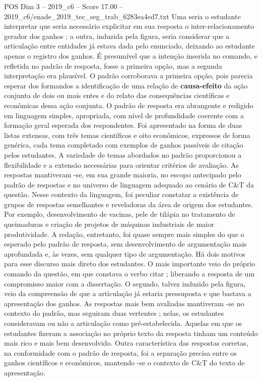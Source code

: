 \begin{textsample}{POS Dim 3 – 2019\_c6 – Score 17.00 – 2019\_c6/enade\_2019\_tec\_seg\_trab\_6283ea4ed7.txt}
Uma seria o estudante interpretar que seria necessário explicitar em sua resposta o inter-relacionamento gerador dos ganhos ; a outra, induzida pela figura, seria considerar que a articulação entre entidades já estava dada pelo enunciado, deixando ao estudante apenas o registro dos ganhos.
É presumível que a intenção inserida no comando, e refletida no padrão de resposta, fosse a primeira opção, mas a segunda interpretação era plausível.
O padrão corroborava a primeira opção, pois parecia esperar dos formandos a identificação de uma relação de \textbf{causa-efeito} da ação conjunta de dois ou mais entes e do relato das consequências científicas e econômicas dessa ação conjunta.
O padrão de resposta era abrangente e redigido em linguagem simples, apropriada, com nível de profundidade coerente com a formação geral esperada dos respondentes.
Foi apresentado na forma de duas listas extensas, com três temas científicos e oito econômicos, expressos de forma genérica, cada tema completado com exemplos de ganhos passíveis de citação pelos estudantes.
A variedade de temas abordados no padrão proporcionou a flexibilidade e a extensão necessárias para orientar critérios de avaliação.
As respostas mantiveram -se, em sua grande maioria, no escopo antecipado pelo padrão de respostas e no universo de linguagem adequado ao cenário de C\&T da questão.
Nesse contexto da linguagem, foi peculiar constatar a existência de grupos de respostas semelhantes e reveladoras da área de origem dos estudantes.
Por exemplo, desenvolvimento de vacinas, pele de tilápia no tratamento de queimaduras e criação de projetos de máquinas industriais de maior produtividade.
A redação, entretanto, foi quase sempre mais simples do que o esperado pelo padrão de resposta, sem desenvolvimento de argumentação mais aprofundada e, às vezes, sem qualquer tipo de argumentação.
Há dois motivos para esse discurso mais direto dos estudantes.
O mais importante veio do próprio comando da questão, em que constava o verbo citar ; liberando a resposta de um compromisso maior com a dissertação.
O segundo, talvez induzido pela figura, veio da compreensão de que a articulação já estaria pressuposta e que bastava a apresentação dos ganhos.
As respostas mais bem avaliadas mantiveram -se no contexto do padrão, mas seguiram duas vertentes ; nelas, os estudantes consideravam ou não a articulação como pré-estabelecida.
Aquelas em que os estudantes fizeram a associação no próprio texto da resposta tinham um conteúdo mais rico e mais bem desenvolvido.
Outra característica das respostas corretas, na conformidade com o padrão de resposta, foi a separação precisa entre os ganhos científicos e econômicos, mantendo -se o contexto de C\&T do texto de apresentação.

\end{textsample}
